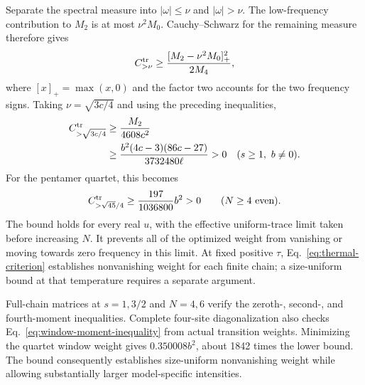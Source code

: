 Separate the spectral measure into $|\omega|\le\nu$ and
$|\omega|>\nu$. The low-frequency contribution to $M_2$ is at most
$\nu^2M_0$. Cauchy--Schwarz for the remaining measure therefore gives
\begin{equation}
 C^{\rm tr}_{>\nu}\ge
 \frac{[M_2-\nu^2M_0]_+^2}{2M_4},
 \label{eq:window-moment-inequality}
\end{equation}
where $[x]_+=\max(x,0)$ and the factor two accounts for the two frequency
signs. Taking $\nu=\sqrt{3c/4}$ and using the preceding inequalities,
\begin{align}
 C^{\rm tr}_{>\sqrt{3c/4}}
 &\ge\frac{M_2}{4608c^2}\notag\\
 &\ge\frac{b^2(4c-3)(86c-27)}{3732480\ell}>0
 \quad(s\ge1,\ b\ne0).
 \label{eq:general-window-bound}
\end{align}
For the pentamer quartet, this becomes
\begin{equation}
 C^{\rm tr}_{>\sqrt{45}/4}\ge\frac{197}{1036800}b^2>0
 \qquad(N\ge4\text{ even}).
 \label{eq:quartet-window-bound}
\end{equation}
The bound holds for every real $u$, with the effective uniform-trace
limit taken before increasing $N$. It prevents all of the optimized
weight from vanishing or moving towards zero frequency in this limit.
At fixed positive $\tau$, Eq.~\eqref{eq:thermal-criterion} establishes
nonvanishing weight for each finite chain; a size-uniform bound at that
temperature requires a separate argument.

Full-chain matrices at $s=1,3/2$ and $N=4,6$ verify the zeroth-, second-,
and fourth-moment inequalities. Complete four-site diagonalization also
checks Eq.~\eqref{eq:window-moment-inequality} from actual transition
weights. Minimizing the quartet window weight gives $0.350008b^2$,
about 1842 times the lower bound. The bound consequently establishes
size-uniform nonvanishing weight while allowing substantially larger
model-specific intensities.
